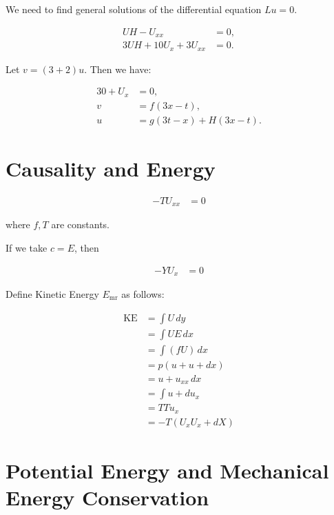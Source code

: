 \documentclass[11pt]{article}
\begin{document}
We need to find general solutions of the differential equation \( Lu = 0 \).

\begin{align}
    UH - U_{xx} &= 0, \\
    3UH + 10U_x + 3U_{xx} &= 0.
\end{align}

Let \( v = (3 + 2)u \). Then we have:

\begin{align}
    30 + U_x &= 0, \\
    v &= f(3x - t), \\
    u &= g(3t - x) + H(3x - t).
\end{align}





\section*{Causality and Energy}

\begin{align}
    -T U_{xx} &= 0
\end{align}

where \( f, T \) are constants.

If we take \( c = E \), then

\begin{align}
    -Y U_{x} &= 0
\end{align}

Define Kinetic Energy \( E_{\text{mr}} \) as follows:

\begin{align}
    \text{KE} &= \int U \, dy \\
    &= \int U E \, dx \\
    &= \int (f U) \, dx \\
    &= p(u + u + dx) \\
    &= u + u_{xx} \, dx \\
    &= \int u + du_{x} \\
    &= T T u_{x} \\
    &= -T(U_{x} U_{x} + dX)
\end{align}





\section*{Potential Energy and Mechanical Energy Conservation}
\end{document}
